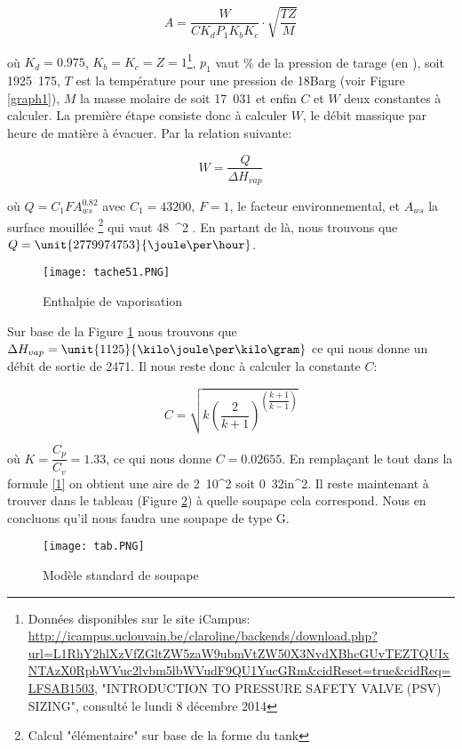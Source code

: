 \begin{equation}
A=\dfrac{W}{CK_dP_1K_bK_c}\cdot \sqrt{\dfrac{TZ}{M}}
\label{1}
\end{equation}

où $K_d=0.975$, $K_b=K_c=Z=1$\footnote{Données disponibles sur le site iCampus: \url{http://icampus.uclouvain.be/claroline/backends/download.php?url=L1RhY2hlXzVfZGltZW5zaW9ubmVtZW50X3NvdXBhcGUvTEZTQUIxNTAzX0RpbWVuc2lvbm5lbWVudF9QU1YucGRm&cidReset=true&cidReq=LFSAB1503}, "INTRODUCTION TO PRESSURE SAFETY VALVE (PSV) SIZING", consulté le lundi 8 décembre 2014}, $p_1$ vaut  \% de la pression de tarage (en \bbar), soit \unit{1925.175}{\kilo \pascal}, $T$ est la température pour une pression de \unit{18}{Barg} (voir Figure \ref{graph1}), $M$ la masse molaire de  soit \unit{17.031}{\gram \per \mole} et enfin $C$ et $W$ deux constantes à calculer. La première étape consiste donc à calculer $W$, le débit massique par heure de matière à évacuer. Par la relation suivante:

$$W=\dfrac{Q}{\Delta H_{vap}}$$

où $Q=C_1FA_{ws}^{0.82}$ avec $C_1=43200$, $F=1$, le facteur environnemental, et $A_ {ws}$ la surface mouillée \footnote{Calcul "élémentaire" sur base de la forme du tank} qui vaut \unit{48\pi}{\meter ^2} . En partant de là, nous trouvons que $Q=\unit{2779974753}{\joule \per \hour}$.

\begin{figure}[ht!]
\centering
\texttt{[image: tache51.PNG]}
\caption{Enthalpie de vaporisation}
\label{graph2}
\end{figure}

Sur base de la Figure \ref{graph2} nous trouvons que $\Delta H_{vap}=\unit{1125}{\kilo \joule \per \kilo \gram}$ ce qui nous donne un débit de sortie de \unit{2471}{\kilo \gram \per \hour}.
Il nous reste donc à calculer la constante $C$:

$$C=\sqrt{k\left( \dfrac{2}{k+1}\right)^{\left( \dfrac{k+1}{k-1}\right)}}$$

où $K=\dfrac{C_p}{C_v}=1.33$, ce qui nous donne $C=0.02655$. En remplaçant le tout dans la formule \ref{1} on obtient une aire de \unit{2.10}{\centi \metre^2} soit \unit{0.32}{in^2}. Il reste maintenant à trouver dans le tableau (Figure \ref{tab}) à quelle soupape cela correspond. Nous en concluons qu'il nous faudra une soupape de type G.

\begin{figure}[ht!]
\centering
\texttt{[image: tab.PNG]}
\caption{Modèle standard de soupape}
\label{tab}
\end{figure}

